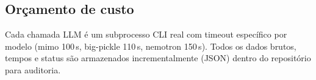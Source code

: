 \subsection{Orçamento de custo}
Cada chamada LLM é um subprocesso CLI real com timeout específico por modelo
(mimo 100\,s, big-pickle 110\,s, nemotron 150\,s). Todos os dados brutos,
tempos e status são armazenados incrementalmente (JSON) dentro do repositório
para auditoria.